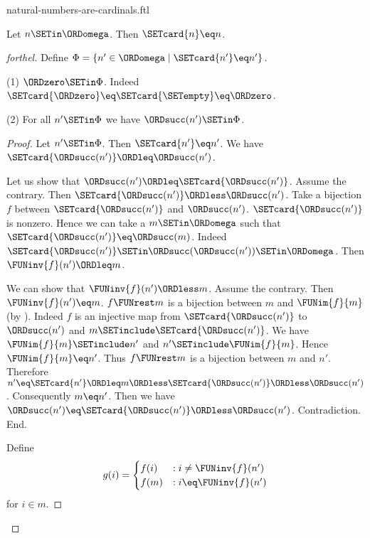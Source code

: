 \documentclass{stex}
\begin{document}
\begin{smodule}{natural-numbers-are-cardinals.ftl}

\begin{theorem}[forthel,id=SET_THEORY_07_2948332552978432]
  Let $n \SETin \ORDomega$.
  Then $\SETcard{n} \eq n$.
\end{theorem}
\begin{proof}[forthel]
  Define $\Phi = \{ n' \in \ORDomega \mid \SETcard{n'} \eq n' \}$.

  (1) $\ORDzero \SETin \Phi$.
  Indeed $\SETcard{\ORDzero} \eq \SETcard{\SETempty} \eq \ORDzero$.

  (2) For all $n' \SETin \Phi$ we have $\ORDsucc(n') \SETin \Phi$.
  \begin{proof}
    Let $n' \SETin \Phi$.
    Then $\SETcard{n'} \eq n'$.
    We have $\SETcard{\ORDsucc(n')} \ORDleq \ORDsucc(n')$.

    Let us show that $\ORDsucc(n') \ORDleq \SETcard{\ORDsucc(n')}$.
      Assume the contrary.
      Then $\SETcard{\ORDsucc(n')} \ORDless \ORDsucc(n')$.
      Take a bijection $f$ between $\SETcard{\ORDsucc(n')}$ and $\ORDsucc(n')$.
      $\SETcard{\ORDsucc(n')}$ is nonzero.
      Hence we can take a $m \SETin \ORDomega$ such that $\SETcard{\ORDsucc(n')} \eq \ORDsucc(m)$.
      Indeed $\SETcard{\ORDsucc(n')} \SETin \ORDsucc(\ORDsucc(n')) \SETin \ORDomega$.
      Then $\FUNinv{f}(n') \ORDleq m$.

      We can show that $\FUNinv{f}(n') \ORDless m$.
        Assume the contrary.
        Then $\FUNinv{f}(n') \eq m$.
        $f \FUNrest m$ is a bijection between $m$ and $\FUNim{f}{m}$ (by ).
        Indeed $f$ is an injective map from $\SETcard{\ORDsucc(n')}$ to $\ORDsucc(n')$ and
        $m \SETinclude \SETcard{\ORDsucc(n')}$.
        We have $\FUNim{f}{m} \SETinclude n'$ and $n' \SETinclude \FUNim{f}{m}$.
        Hence $\FUNim{f}{m} \eq n'$.
        Thus $f \FUNrest m$ is a bijection between $m$ and $n'$.
        Therefore $n'
          \eq \SETcard{n'}
          \ORDleq m
          \ORDless \SETcard{\ORDsucc(n')}
          \ORDless \ORDsucc(n')$.
        Consequently $m \eq n'$.
        Then we have $\ORDsucc(n') \eq \SETcard{\ORDsucc(n')} \ORDless \ORDsucc(n')$.
        Contradiction.
      End.

      Define \[ g(i) =
        \begin{cases}
          f(i)  & : i \neq \FUNinv{f}(n')
          \\
          f(m)  & : i \eq \FUNinv{f}(n')
        \end{cases} \]
      for $i \in m$.


\end{proof}
\end{proof}
\end{smodule}
\end{document}
